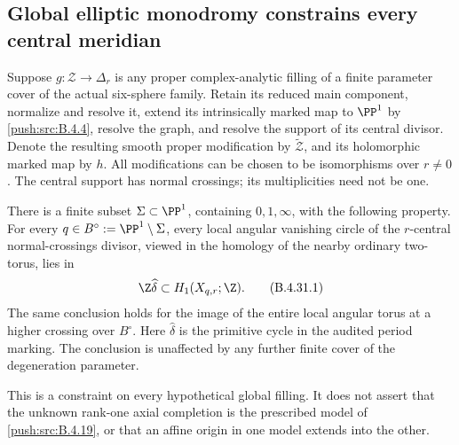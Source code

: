 \subsection{Global elliptic monodromy constrains every central meridian}

\begin{proposition}\label{push:src:B.4.31}
Suppose $g:\mathcal Z\to\Delta_r$ is any proper complex-analytic
filling of a finite parameter cover of the actual six-sphere
family. Retain its reduced main component, normalize and resolve
it, extend its intrinsically marked map to $\PP^1$ by \ref{push:src:B.4.4},
resolve the graph, and resolve the support of its central divisor. Denote
the resulting smooth proper modification by $\widetilde{\mathcal Z}$,
and its holomorphic marked map by $h$. All modifications can be
chosen to be isomorphisms over $r\ne0$. The central support has
normal crossings; its multiplicities need not be one.

There is a finite subset $\Sigma\subset\PP^1$, containing
$0,1,\infty$, with the following property. For every
$q\in B^\circ:=\PP^1\setminus\Sigma$, every local angular
vanishing circle of the $r$-central normal-crossings divisor,
viewed in the homology of the nearby ordinary two-torus, lies in
\[
             \Z\widehat\delta\subset H_1(X_{q,r};\Z).
 \tag{B.4.31.1}
\]
The same conclusion holds for the image of the entire local
angular torus at a higher crossing over $B^\circ$.
Here $\widehat\delta$ is the primitive cycle in the audited
period marking. The conclusion is unaffected by any further
finite cover of the degeneration parameter.

This is a constraint on every hypothetical global filling. It
does not assert that the unknown rank-one axial completion is
the prescribed model of \ref{push:src:B.4.19}, or that an affine origin in one
model extends into the other.
\end{proposition}

